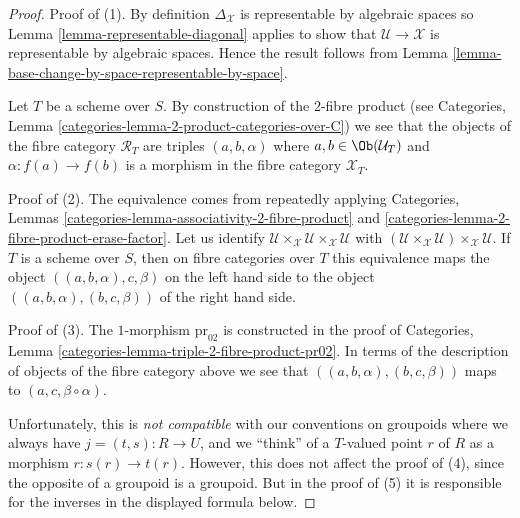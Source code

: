 \begin{proof}
Proof of (1). By definition $\Delta_\mathcal{X}$ is representable
by algebraic spaces so
Lemma \ref{lemma-representable-diagonal}
applies to show that $\mathcal{U} \to \mathcal{X}$ is representable
by algebraic spaces. Hence the result follows from
Lemma \ref{lemma-base-change-by-space-representable-by-space}.

\medskip\noindent
Let $T$ be a scheme over $S$. By construction of the $2$-fibre product (see
Categories, Lemma \ref{categories-lemma-2-product-categories-over-C})
we see that the objects of the fibre category $\mathcal{R}_T$
are triples $(a, b, \alpha)$ where $a, b \in \Ob(\mathcal{U}_T)$
and $\alpha : f(a) \to f(b)$
is a morphism in the fibre category $\mathcal{X}_T$.

\medskip\noindent
Proof of (2). The equivalence comes from repeatedly applying
Categories, Lemmas \ref{categories-lemma-associativity-2-fibre-product} and
\ref{categories-lemma-2-fibre-product-erase-factor}.
Let us identify
$\mathcal{U} \times_\mathcal{X} \mathcal{U} \times_\mathcal{X} \mathcal{U}$
with
$(\mathcal{U} \times_\mathcal{X} \mathcal{U})
\times_\mathcal{X} \mathcal{U}$.
If $T$ is a scheme over $S$, then on fibre categories over $T$
this equivalence maps the object
$((a, b, \alpha), c, \beta)$ on the left hand side
to the object $((a, b, \alpha), (b, c, \beta))$ of the right hand side.

\medskip\noindent
Proof of (3). The $1$-morphism $\text{pr}_{02}$ is constructed in the proof of
Categories, Lemma \ref{categories-lemma-triple-2-fibre-product-pr02}.
In terms of the description of objects of the fibre category
above we see that $((a, b, \alpha), (b, c, \beta))$
maps to $(a, c, \beta \circ \alpha)$.

\medskip\noindent
Unfortunately, this is {\it not compatible} with our conventions on
groupoids where we always have $j = (t, s) : R \to U$, and we ``think''
of a $T$-valued point $r$ of $R$ as a morphism $r : s(r) \to t(r)$.
However, this does not affect the proof of (4), since the opposite of
a groupoid is a groupoid. But in the proof of (5) it is responsible
for the inverses in the displayed formula below.


\end{proof}

